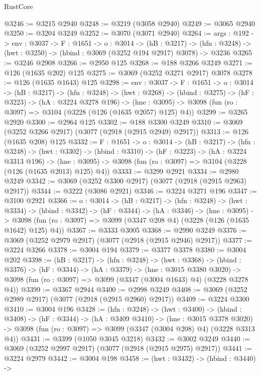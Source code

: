 \begin{lexlean}{RustCore}
\begin{coremodule}
@3246 := @3215 @2940
@3248 := @3219 (@3058 @2940)
@3249 := @3065 @2940
@3250 := @3204 @3249
@3252 := @3070 (@3071 @2940)
@3264 := {args : @192} ->
  {env : @3037} ->
  {F : @1651} ->
  {o : @3014} ->
  (hB : @3217) ->
  (hfn : @3248) -> (hwt : @3250) -> (hbind : @3069 (@3252 @194 @2917) @3078) -> @3236
@3265 := @3246 @2908
@3266 := @2950 @125
@3268 := @188 @3266 @3249
@3271 := @126 (@1635 @202) @125
@3275 := @3069 (@3252 @3271 @2917) @3078
@3278 := @126 (@1635 @1643) @125
@3298 := {env : @3037} ->
  {F : @1651} ->
  {o : @3014} ->
  (hB : @3217) ->
  (hfn : @3248) ->
  (hwt : @3268) ->
  (hbind : @3275) ->
  (hF : @3223) ->
  (hA : @3224 @3278 @196) ->
  (hne : @3095) -> @3098 (fun (ro : @3097) => @3104 (@3228 (@126 (@1635 @2057) @125) @4))
@3299 := @3265 @2920
@3300 := @2964 @125
@3302 := @188 @3300 @3249
@3310 := @3069 (@3252 @3266 @2917) (@3077 (@2918 (@2915 @2949) @2917))
@3313 := @126 (@1635 @208) @125
@3332 := {F : @1651} ->
  {o : @3014} ->
  (hB : @3217) ->
  (hfn : @3248) ->
  (hwt : @3302) ->
  (hbind : @3310) ->
  (hF : @3223) ->
  (hA : @3224 @3313 @196) ->
  (hne : @3095) -> @3098 (fun (ro : @3097) => @3104 (@3228 (@126 (@1635 @2013) @125) @4))
@3333 := @3299 @2921
@3334 := @2980 @3249
@3342 := @3069 (@3252 @3300 @2917) (@3077 (@2918 (@2915 @2963) @2917))
@3344 := @3222 (@3086 @2921)
@3346 := @3224 @3271 @196
@3347 := @3100 @2921
@3366 := {o : @3014} ->
  (hB : @3217) ->
  (hfn : @3248) ->
  (hwt : @3334) ->
  (hbind : @3342) ->
  (hF : @3344) ->
  (hA : @3346) ->
  (hne : @3095) ->
  @3098 (fun (ro : @3097) => @3099 (@3347 @208 @4) (@3228 (@126 (@1635 @1642) @125) @4))
@3367 := @3333 @3005
@3368 := @2990 @3249
@3376 := @3069 (@3252 @2979 @2917) (@3077 (@2918 (@2915 @2946) @2917))
@3377 := @3224 @3266
@3378 := @3004 @194
@3379 := @3377 @3378
@3380 := @3004 @202
@3398 := (hB : @3217) ->
  (hfn : @3248) ->
  (hwt : @3368) ->
  (hbind : @3376) ->
  (hF : @3344) ->
  (hA : @3379) ->
  (hne : @3015 @3380 @3020) ->
  @3098 (fun (ro : @3097) => @3099 (@3347 (@3004 @1643) @4) (@3228 @3278 @4))
@3399 := @3367 @2944
@3400 := @2998 @3249
@3408 := @3069 (@3252 @2989 @2917) (@3077 (@2918 (@2915 @2960) @2917))
@3409 := @3224 @3300
@3410 := @3004 @196
@3428 := (hfn : @3248) ->
  (hwt : @3400) ->
  (hbind : @3408) ->
  (hF : @3344) ->
  (hA : @3409 @3410) ->
  (hne : @3015 @3378 @3020) ->
  @3098 (fun (ro : @3097) => @3099 (@3347 (@3004 @208) @4) (@3228 @3313 @4))
@3431 := @3399 (@1050 @3045 @3218)
@3432 := @3002 @3249
@3440 := @3069 (@3252 @2997 @2917) (@3077 (@2918 (@2915 @2975) @2917))
@3441 := @3224 @2979
@3442 := @3004 @198
@3458 := (hwt : @3432) ->
  (hbind : @3440) ->

\end{coremodule}
\end{lexlean}
